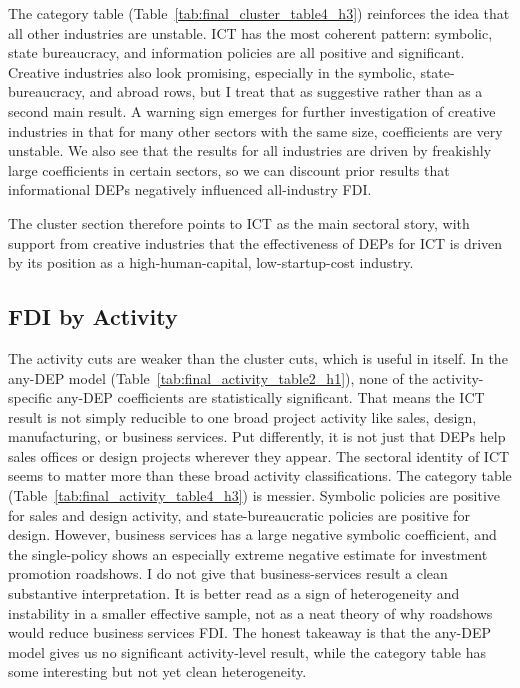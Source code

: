\documentclass[12pt]{article}
\let\oldsubsection\subsection
\renewcommand{\subsection}{\FloatBarrier\oldsubsection}
\begin{document}
The category table (Table~\ref{tab:final_cluster_table4_h3}) reinforces the idea that all other industries are unstable. ICT has the most coherent pattern: symbolic, state bureaucracy, and information policies are all positive and significant. Creative industries also look promising, especially in the symbolic, state-bureaucracy, and abroad rows, but I treat that as suggestive rather than as a second main result. A warning sign emerges for further investigation of creative industries in that for many other sectors with the same size, coefficients are very unstable. We also see that the results for all industries are driven by freakishly large coefficients in certain sectors, so we can discount prior results that informational DEPs negatively influenced all-industry FDI.

The cluster section therefore points to ICT as the main sectoral story, with support from creative industries that the effectiveness of DEPs for ICT is driven by its position as a high-human-capital, low-startup-cost industry.

\FloatBarrier
\subsection{FDI by Activity} \label{ss:activity}





The activity cuts are weaker than the cluster cuts, which is useful in itself. In the any-DEP model (Table~\ref{tab:final_activity_table2_h1}), none of the activity-specific any-DEP coefficients are statistically significant. That means the ICT result is not simply reducible to one broad project activity like sales, design, manufacturing, or business services. Put differently, it is not just that DEPs help sales offices or design projects wherever they appear. The sectoral identity of ICT seems to matter more than these broad activity classifications. The category table (Table~\ref{tab:final_activity_table4_h3}) is messier. Symbolic policies are positive for sales and design activity, and state-bureaucratic policies are positive for design. However, business services has a large negative symbolic coefficient, and the single-policy shows an especially extreme negative estimate for investment promotion roadshows. I do not give that business-services result a clean substantive interpretation. It is better read as a sign of heterogeneity and instability in a smaller effective sample, not as a neat theory of why roadshows would reduce business services FDI. The honest takeaway is that the any-DEP model gives us no significant activity-level result, while the category table has some interesting but not yet clean heterogeneity.
\end{document}

